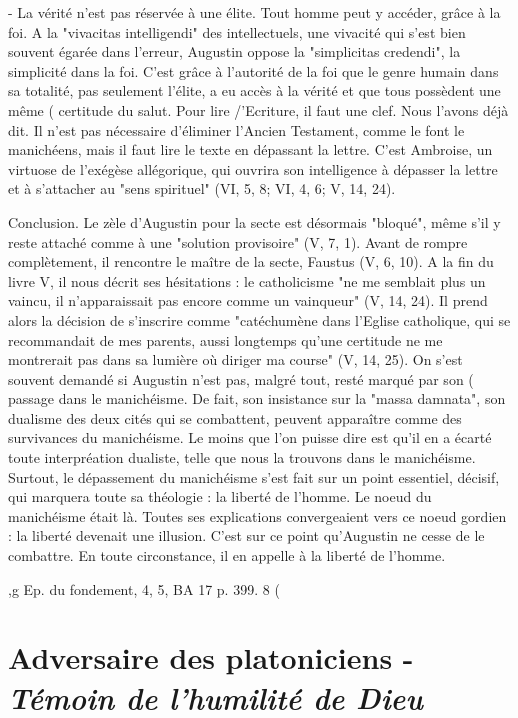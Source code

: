 -	La vérité n'est pas réservée à une élite. Tout homme peut y accéder, grâce à la foi.  A la "vivacitas intelligendi" des intellectuels, une vivacité qui s'est bien souvent égarée dans l'erreur, Augustin oppose la "simplicitas credendi", la simplicité dans la foi. C'est grâce à l'autorité de la foi que le genre humain dans sa totalité, pas seulement l'élite, a eu accès à la vérité et que tous possèdent une même
(	certitude du salut.
Pour lire /'Ecriture, il faut une clef. Nous l'avons déjà dit. Il n'est pas nécessaire d'éliminer l'Ancien Testament, comme le font le manichéens, mais il faut lire le texte en dépassant la lettre. C'est Ambroise, un virtuose de l'exégèse allégorique, qui ouvrira son intelligence à dépasser la lettre et à s'attacher au "sens spirituel" (VI, 5, 8;  VI, 4, 6; V, 14, 24).

Conclusion. Le zèle d'Augustin pour la secte est désormais "bloqué", même s'il y reste attaché comme à une "solution provisoire" (V, 7, 1). Avant de rompre complètement, il rencontre le maître de la secte, Faustus (V, 6, 10). A la fin du livre V, il nous décrit ses hésitations : le catholicisme "ne me semblait plus un vaincu, il n'apparaissait pas encore comme un vainqueur" (V, 14, 24). Il prend alors la décision de s'inscrire comme "catéchumène dans l'Eglise catholique, qui se recommandait de mes parents, aussi longtemps qu'une certitude ne me montrerait pas dans sa lumière où diriger ma course" (V, 14, 25).
On s'est souvent demandé si Augustin n'est pas, malgré tout, resté marqué par son	(
passage dans le manichéisme. De fait, son insistance sur la "massa damnata", son
dualisme des deux cités qui se combattent, peuvent apparaître comme des survivances du manichéisme. Le moins que l'on puisse dire est qu'il en a écarté toute interpréation dualiste, telle que nous la trouvons dans le manichéisme. Surtout, le dépassement du manichéisme s'est fait sur un point essentiel, décisif, qui marquera toute sa théologie : la liberté de l'homme. Le noeud du manichéisme était là. Toutes ses explications convergeaient vers ce noeud gordien : la liberté devenait une illusion. C'est sur ce point qu'Augustin ne cesse de le combattre. En toute circonstance, il en appelle à la liberté de l'homme.






,g  Ep. du fondement, 4, 5, BA 17 p. 399.
8
(

\section{Adversaire des platoniciens  - \textit{Témoin de l'humilité de Dieu}} 

